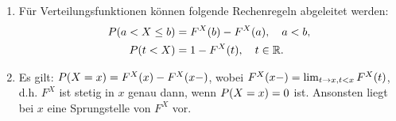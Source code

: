 \documentclass{lecture}
\begin{document}
    \begin{remark}
        \begin{enumerate}
            \item Für Verteilungsfunktionen können folgende Rechenregeln abgeleitet werden:
            \begin{align*}
                P\parentheses*{a < X \le b} &= F^X\parentheses*{b} - F^X\parentheses*{a}, \quad a < b,\\
                P\parentheses*{t < X} &= 1 - F^X\parentheses*{t}, \quad t \in \R.
            \end{align*}
            \item Es gilt: \(P\parentheses*{X = x} = F^X\parentheses*{x} - F^X\parentheses*{x-}\), wobei \(F^X\parentheses*{x-} = \lim_{t \to x, t < x}F^X\parentheses*{t}\), d.h. \(F^X\) ist stetig in \(x\) genau dann, wenn \(P\parentheses*{X = x} = 0\) ist.
            Ansonsten liegt bei \(x\) eine Sprungstelle von \(F^X\) vor.


\end{enumerate}
\end{remark}
\end{document}
